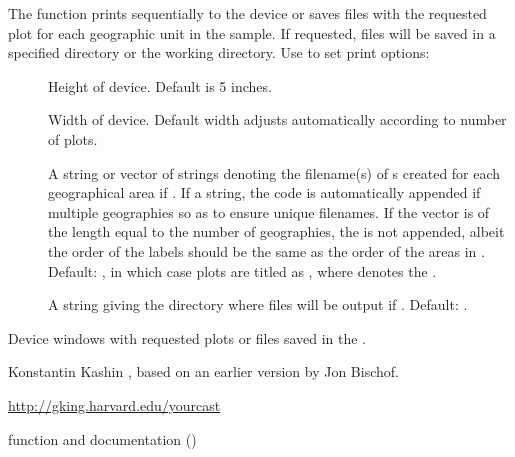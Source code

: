 \begin{Details}
The function prints sequentially to the device or saves  files
with the requested plot for each geographic unit in the sample. If
requested,  files will be saved in a specified directory or
the working directory. Use  to set print options:
\begin{description}

\item[] Height of device. Default is 5 inches.

\item[] Width of device. Default width adjusts automatically according to number of plots.

\item[] A string or vector of strings denoting the filename(s) of s created for each geographical area if . If a string, the  code is automatically appended if multiple geographies so as to ensure unique filenames. If the vector is of the length equal to the number of geographies, the  is not appended, albeit the order of the labels should be the same as the order of the areas in . Default: , in which case plots are titled as , where  denotes the .

\item[] A string giving the directory where  files will be output if . Default: .

\end{description}
 
\end{Details}
%
\begin{Value}
Device windows with requested plots or  files saved
in the .
\end{Value}
%
\begin{Author}\relax
Konstantin Kashin , based on an earlier version by Jon Bischof.
\end{Author}
%
\begin{References}\relax
\url{http://gking.harvard.edu/yourcast}
\end{References}
%
\begin{SeeAlso}\relax
{} function and documentation
()
\end{SeeAlso}
%
